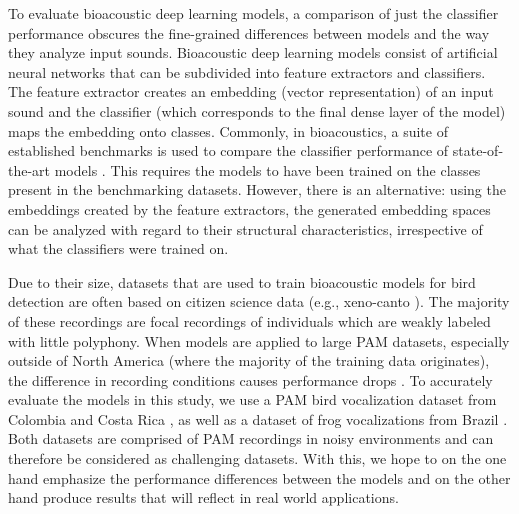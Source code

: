 To evaluate bioacoustic deep learning models, a comparison of just the classifier performance obscures the fine-grained differences between models and the way they analyze input sounds.
Bioacoustic deep learning models consist of artificial neural networks that can be subdivided into feature extractors and classifiers. 
The feature extractor creates an embedding (vector representation) of an input sound and the classifier (which corresponds to the final dense layer of the model) maps the embedding onto classes.
Commonly, in bioacoustics, a suite of established benchmarks is used to compare the classifier performance of state-of-the-art models \cite{hamer_birb_2023}.
This requires the models to have been trained on the classes present in the benchmarking datasets.
However, there is an alternative: using the embeddings created by the feature extractors, the generated embedding spaces can be analyzed with regard to their structural characteristics, irrespective of what the classifiers were trained on.


Due to their size, datasets that are used to train bioacoustic models for bird detection are often based on citizen science data (e.g., xeno-canto \cite{xeno-canto_xeno-canto_2025}).
The majority of these recordings are focal recordings of individuals which are weakly labeled with little polyphony.
When models are applied to large PAM datasets, especially outside of North America (where the majority of the training data originates), the difference in recording conditions causes performance drops \cite{perez-granados_birdnet_2023}.
To accurately evaluate the models in this study, we use a PAM bird vocalization dataset from Colombia and Costa Rica \cite{vega-hidalgo_collection_2023}, as well as a dataset of frog vocalizations from Brazil \cite{canas_dataset_2023}.
Both datasets are comprised of PAM recordings in noisy environments and can therefore be considered as challenging datasets.
With this, we hope to on the one hand emphasize the performance differences between the models and on the other hand produce results that will reflect in real world applications.


